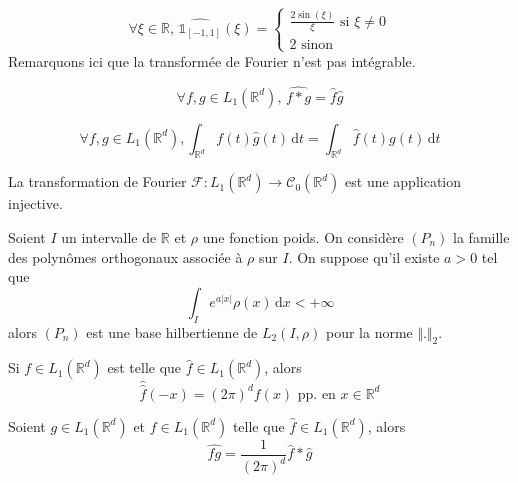   \begin{example}
    \[
    \forall \xi \in \mathbb{R}, \, \widehat{\mathbb{1}_{[-1,1]}}(\xi) =
    \begin{cases}
      \frac{2 \sin(\xi)}{\xi} \text{ si } \xi \neq 0 \\
      2 \text{ sinon}
    \end{cases}
    \]
    Remarquons ici que la transformée de Fourier n'est pas intégrable.
  \end{example}


  \begin{proposition}
    \[ \forall f, g \in L_1(\mathbb{R}^d), \, \widehat{f * g} = \widehat{f} \widehat{g} \]
  \end{proposition}

  \begin{theorem}
    \[ \forall f, g \in L_1(\mathbb{R}^d), \int_{\mathbb{R}^d} f(t) \widehat{g}(t) \, \mathrm{d}t = \int_{\mathbb{R}^d} \widehat{f}(t) g(t) \, \mathrm{d}t \]
  \end{theorem}

  \begin{corollary}
    La transformation de Fourier $\mathcal{F} : L_1(\mathbb{R}^d) \rightarrow \mathcal{C}_0(\mathbb{R}^d)$ est une application injective.
  \end{corollary}


  \begin{application}
    Soient $I$ un intervalle de $\mathbb{R}$ et $\rho$ une fonction poids. On considère $(P_n)$ la famille des polynômes orthogonaux associée à $\rho$ sur $I$. On suppose qu'il existe $a > 0$ tel que
    \[ \int_I e^{a \vert x \vert} \rho(x) \, \mathrm{d}x < +\infty \]
    alors $(P_n)$ est une base hilbertienne de $L_2(I, \rho)$ pour la norme $\Vert . \Vert_2$.
  \end{application}


  \begin{theorem}
    Si $f \in L_1(\mathbb{R}^d)$ est telle que $\widehat{f} \in L_1(\mathbb{R}^d)$, alors
    \[ \widehat{\widehat{f}}(-x) = (2\pi)^d f(x) \text{ pp. en } x \in \mathbb{R}^d \]
  \end{theorem}

  \begin{proposition}
    Soient $g \in L_1(\mathbb{R}^d)$ et $f \in L_1(\mathbb{R}^d)$ telle que $\widehat{f} \in L_1(\mathbb{R}^d)$, alors
    \[ \widehat{fg} = \frac{1}{(2\pi)^d} \widehat{f} * \widehat{g} \]
  \end{proposition}

